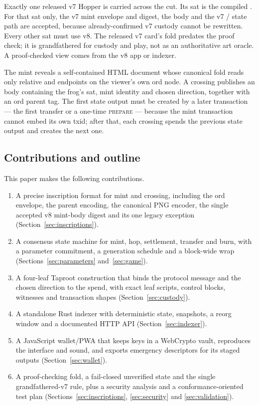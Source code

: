 Exactly one released v7 Hopper is carried across the cut. Its sat is the
compiled . For that sat only, the v7 mint envelope
and digest, the  body and the v7 /
state path are accepted, because already-confirmed v7 custody cannot be
rewritten. Every other sat must use v8. The released v7 card's fold predates
the proof check; it is grandfathered for custody and play, not as an
authoritative art oracle. A proof-checked view comes from the v8 app or
indexer.

The mint reveals a self-contained HTML document whose canonical fold reads
only relative  and  endpoints on the viewer's own
ord node. A crossing publishes an  body
containing the frog's sat, mint identity and chosen direction, together with
an ord parent tag. The first state output must be created by a later
transaction --- the first transfer or a one-time \textsc{prepare} --- because
the mint transaction cannot embed its own txid; after that, each crossing
spends the previous state output and creates the next one.

\subsection{Contributions and outline}

This paper makes the following contributions.

\begin{enumerate}[leftmargin=1.6em,itemsep=0.25em]
  \item A precise inscription format for mint and crossing, including the ord
        envelope, the parent encoding, the canonical PNG encoder, the single
        accepted v8 mint-body digest and its one legacy exception
        (Section~\ref{sec:inscriptions}).
  \item A consensus state machine for mint, hop, settlement, transfer and
        burn, with a parameter commitment, a generation schedule and a
        block-wide wrap (Sections~\ref{sec:parameters} and~\ref{sec:game}).
  \item A four-leaf Taproot construction that binds the protocol message and
        the chosen direction to the spend, with exact leaf scripts, control
        blocks, witnesses and transaction shapes
        (Section~\ref{sec:custody}).
  \item A standalone Rust indexer with deterministic state, snapshots, a
        reorg window and a documented HTTP API
        (Section~\ref{sec:indexer}).
  \item A JavaScript wallet/PWA that keeps keys in a WebCrypto vault,
        reproduces the interface and sound, and exports emergency descriptors
        for its staged outputs (Section~\ref{sec:wallet}).
  \item A proof-checking fold, a fail-closed unverified state and the single
        grandfathered-v7 rule, plus a security analysis and a
        conformance-oriented test plan
        (Sections~\ref{sec:inscriptions}, \ref{sec:security} and
        \ref{sec:validation}).
\end{enumerate}

